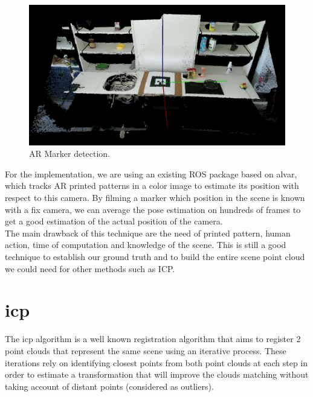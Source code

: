 \begin{figure}[t!]
    \centering
    \includegraphics[width=\textwidth]{images/marker_detection.png}
    \caption{AR Marker detection.}
    \label{fig:ar_marker_kitchen}
\end{figure}

For the implementation, we are using an existing ROS package based on alvar, which tracks AR printed patterns in a color image to estimate its position with respect to this camera. By filming a marker which position in the scene is known with a fix camera, we can average the pose estimation on hundreds of frames to get a good estimation of the actual position of the camera. \\
The main drawback of this technique are the need of printed pattern, human action, time of computation and knowledge of the scene. This is still a good technique to establish our ground truth and to build the entire scene point cloud we could need for other methods such as ICP.

\section{\acrlong{icp}}

The \acrfull{icp} algorithm is a well known registration algorithm that aims to register 2 point clouds that represent the same scene using an iterative process. These iterations rely on identifying closest points from both point clouds at each step in order to estimate a transformation that will improve the clouds matching without taking account of distant points (considered as outliers).\\

